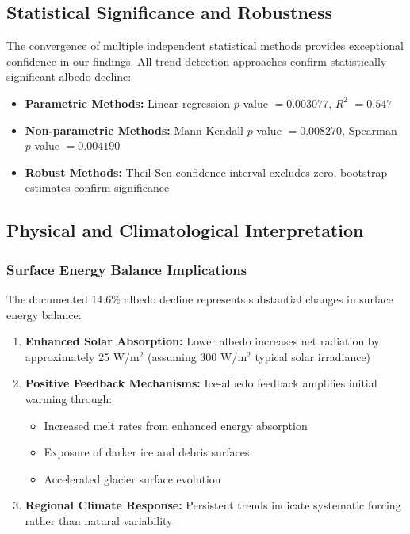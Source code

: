 \documentclass[12pt,a4paper]{article}
\newcommand{\pvalue}{$p$-value}
\newcommand{\rsquared}{$R^2$}
\begin{document}
\subsection{Statistical Significance and Robustness}

The convergence of multiple independent statistical methods provides exceptional confidence in our findings. All trend detection approaches confirm statistically significant albedo decline:

\begin{itemize}
    \item \textbf{Parametric Methods:} Linear regression \pvalue{} $= 0.003077$, \rsquared{} $= 0.547$
    \item \textbf{Non-parametric Methods:} Mann-Kendall \pvalue{} $= 0.008270$, Spearman \pvalue{} $= 0.004190$
    \item \textbf{Robust Methods:} Theil-Sen confidence interval excludes zero, bootstrap estimates confirm significance
\end{itemize}

\subsection{Physical and Climatological Interpretation}

\subsubsection{Surface Energy Balance Implications}

The documented 14.6\% albedo decline represents substantial changes in surface energy balance:

\begin{enumerate}
    \item \textbf{Enhanced Solar Absorption:} Lower albedo increases net radiation by approximately 25 W/m$^2$ (assuming 300 W/m$^2$ typical solar irradiance)
    
    \item \textbf{Positive Feedback Mechanisms:} Ice-albedo feedback amplifies initial warming through:
    \begin{itemize}
        \item Increased melt rates from enhanced energy absorption
        \item Exposure of darker ice and debris surfaces  
        \item Accelerated glacier surface evolution
    \end{itemize}
    
    \item \textbf{Regional Climate Response:} Persistent trends indicate systematic forcing rather than natural variability
\end{enumerate}
\end{document}
